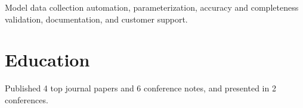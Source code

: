 \documentclass[letterpaper]{deedy-resume-openfont}
\begin{document}
\begin{tightemize}
\item Model data collection automation, parameterization, accuracy and completeness validation, documentation, and customer support.

\end{tightemize}
\sectionsep





\section{Education} 

\begin{tightemize}
\item Published 4 top journal papers and 6 conference notes, and presented in 2 conferences.
\end{tightemize}
\sectionsep
\end{document}
